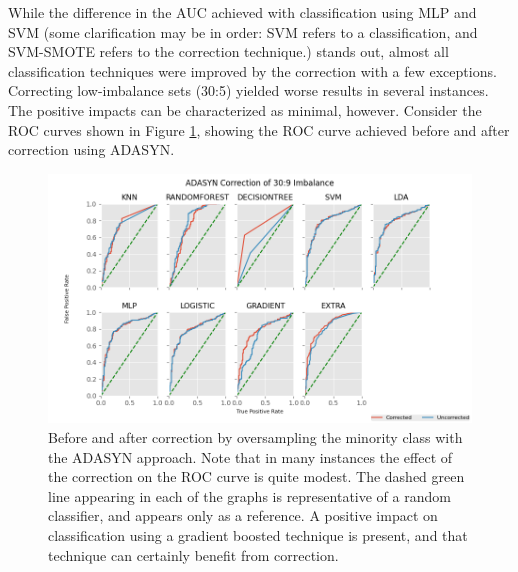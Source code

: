 \documentclass[letterpaper]{report}
\begin{document}
While the difference in the AUC achieved with classification using MLP and SVM (some clarification may be in order: SVM refers to a classification, and SVM-SMOTE refers to the correction technique.) stands out, almost all classification techniques were improved by the correction with a few exceptions. Correcting low-imbalance sets (30:5) yielded worse results in several instances. The positive impacts can be characterized as minimal, however. Consider the ROC curves shown in Figure \ref{fig:auc}, showing the ROC curve achieved before and after correction using ADASYN.

\begin{figure}[h]
	\centering
	\includegraphics[height=0.35\textheight]{figures/roc-corrected.png}
	\caption[Before and after correction]{Before and after correction by oversampling the minority class with the ADASYN approach. Note that in many instances the effect of the correction on the ROC curve is quite modest. The dashed green line appearing in each of the graphs is representative of a random classifier, and appears only as a reference. A positive impact on classification using a gradient boosted technique is present, and that technique can certainly benefit from correction. }
	\label{fig:auc}
\end{figure}
\end{document}

